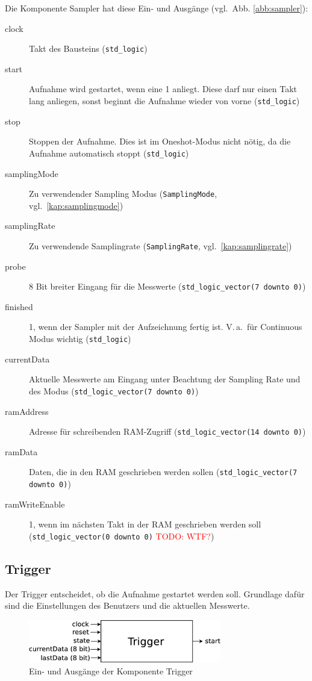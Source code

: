 \documentclass[IN,ngerman,utf8,12pt]{tumbook}
\newcommand\todo[1]{\textcolor{red}{TODO: #1}}
\newcommand{\vgl}{vgl.\ }
\newcommand{\Va}{V.\,a.\ }
\begin{document}
Die Komponente Sampler hat diese Ein- und Ausgänge (\vgl Abb. \ref{abb:sampler}):
\begin{description}
    \item[clock] Takt des Bausteins (\texttt{std\_logic})
    \item[start] Aufnahme wird gestartet, wenn eine 1 anliegt. Diese darf nur einen Takt lang anliegen, sonst beginnt die Aufnahme wieder von vorne (\texttt{std\_logic})
    \item[stop] Stoppen der Aufnahme. Dies ist im Oneshot-Modus nicht nötig, da die Aufnahme automatisch stoppt (\texttt{std\_logic})
    \item[samplingMode] Zu verwendender Sampling Modus (\texttt{SamplingMode}, \vgl \ref{kap:samplingmode})
    \item[samplingRate] Zu verwendende Samplingrate (\texttt{SamplingRate}, \vgl \ref{kap:samplingrate})
    \item[probe] 8 Bit breiter Eingang für die Messwerte (\texttt{std\_logic\_vector(7 downto 0)})
    \item[finished] 1, wenn der Sampler mit der Aufzeichnung fertig ist. \Va für Continuous Modus wichtig (\texttt{std\_logic})
    \item[currentData] Aktuelle Messwerte am Eingang unter Beachtung der Sampling Rate und des Modus (\texttt{std\_logic\_vector(7 downto 0)})
    \item[ramAddress] Adresse für schreibenden RAM-Zugriff (\texttt{std\_logic\_vector(14 downto 0)})
    \item[ramData] Daten, die in den RAM geschrieben werden sollen (\texttt{std\_logic\_vector(7 downto 0)})
    \item[ramWriteEnable] 1, wenn im nächsten Takt in der RAM geschrieben werden soll (\texttt{std\_logic\_vector(0 downto 0)} \todo{WTF?})
\end{description}

\subsection{Trigger}

Der Trigger entscheidet, ob die Aufnahme gestartet werden soll.
Grundlage dafür sind die Einstellungen des Benutzers und die aktuellen Messwerte.

\begin{figure}[H]
    \centerline{
        \includegraphics[width=0.75\textwidth]{img/trigger}
    }
    \label{abb:trigger}
    \caption{Ein- und Ausgänge der Komponente Trigger}
\end{figure}
\end{document}
